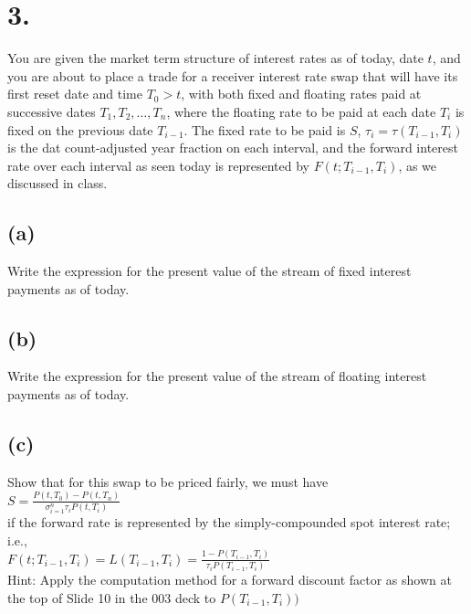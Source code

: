 \documentclass{article}
\begin{document}
\section*{3.}
{\Large 

You are given the market term structure of interest rates as of today, date $t$, and you are about to place a trade for a receiver interest rate swap that will have its first reset date and time $T_0 > t$, with both fixed and floating rates paid at successive dates $T_1, T_2, \dots, T_n$, where the floating rate to be paid at each date $T_i$ is fixed on the previous date $T_{i-1}$. The fixed rate to be paid is $S$, $\tau_i = \tau(T_{i-1}, T_i)$ is the dat count-adjusted year fraction on each interval, and the forward interest rate over each interval as seen today is represented by $F(t; T_{i-1}, T_i)$, as we discussed in class.

\subsection*{(a)}

Write the expression for the present value of the stream of fixed interest payments as of today.


\subsection*{(b)}

Write the expression for the present value of the stream of floating interest payments as of today.


\subsection*{(c)}

Show that for this swap to be priced fairly, we must have \\
$S = \frac{P(t, T_0) - P(t, T_n)}{\sigma_{i=1}^{n}\tau_iP(t, T_i)}$ \\ 
if the forward rate is represented by the simply-compounded spot interest rate; i.e., \\ 
$F(t; T_{i-1}, T_i) = L(T_{i-1}, T_i) = \frac{1-P(T_{i-1}, T_i)}{\tau_iP(T_{i-1}, T_i)}$ \\ 
Hint: Apply the computation method for a forward discount factor as shown at the top of Slide 10 in the 003 deck to $P(T_{i-1}, T_{i}))$ \\ \\ 


}
\end{document}
